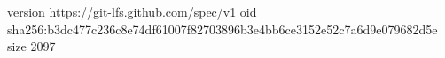 version https://git-lfs.github.com/spec/v1
oid sha256:b3dc477c236c8e74df61007f82703896b3e4bb6ce3152e52c7a6d9e079682d5e
size 2097
